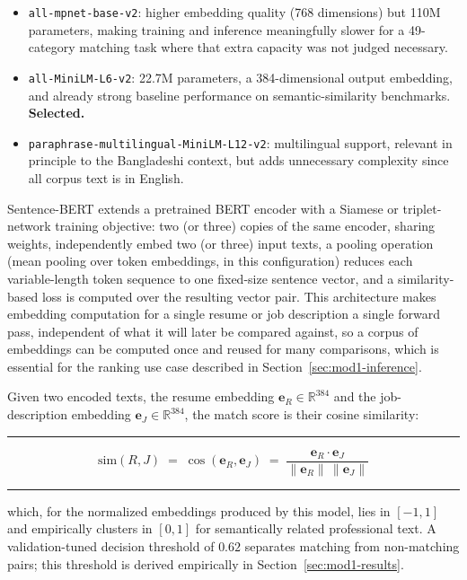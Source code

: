 \documentclass[11pt,a4paper]{article}
\newcommand{\code}[1]{\texttt{\footnotesize #1}}
\newenvironment{formulabox}
  {\begin{center}\color{TPteal}\rule{0.92\linewidth}{0.8pt}\par\vspace{5pt}\color{TPnavy}}
  {\par\vspace{3pt}\color{TPteal}\rule{0.92\linewidth}{0.8pt}\end{center}}
\begin{document}
\begin{itemize}[leftmargin=1.4cm]
  \item \code{all-mpnet-base-v2}: higher embedding quality (768 dimensions) but 110M parameters, making training and inference meaningfully slower for a 49-category matching task where that extra capacity was not judged necessary.
  \item \code{all-MiniLM-L6-v2}: 22.7M parameters, a 384-dimensional output embedding, and already strong baseline performance on semantic-similarity benchmarks. \textbf{Selected.}
  \item \code{paraphrase-multilingual-MiniLM-L12-v2}: multilingual support, relevant in principle to the Bangladeshi context, but adds unnecessary complexity since all corpus text is in English.
\end{itemize}

Sentence-BERT extends a pretrained BERT encoder with a Siamese or triplet-network training objective: two (or three) copies of the same encoder, sharing weights, independently embed two (or three) input texts, a pooling operation (mean pooling over token embeddings, in this configuration) reduces each variable-length token sequence to one fixed-size sentence vector, and a similarity-based loss is computed over the resulting vector pair. This architecture makes embedding computation for a single resume or job description a single forward pass, independent of what it will later be compared against, so a corpus of embeddings can be computed once and reused for many comparisons, which is essential for the ranking use case described in Section~\ref{sec:mod1-inference}.

Given two encoded texts, the resume embedding $\mathbf{e}_R \in \mathbb{R}^{384}$ and the job-description embedding $\mathbf{e}_J \in \mathbb{R}^{384}$, the match score is their cosine similarity:

\begin{formulabox}
\begin{equation}
\label{eq:cosine}
\mathrm{sim}(R,J) \;=\; \cos(\mathbf{e}_R, \mathbf{e}_J) \;=\; \frac{\mathbf{e}_R \cdot \mathbf{e}_J}{\lVert\mathbf{e}_R\rVert\,\lVert\mathbf{e}_J\rVert}
\end{equation}
\end{formulabox}

which, for the normalized embeddings produced by this model, lies in $[-1,1]$ and empirically clusters in $[0,1]$ for semantically related professional text. A validation-tuned decision threshold of $0.62$ separates matching from non-matching pairs; this threshold is derived empirically in Section~\ref{sec:mod1-results}.
\end{document}
